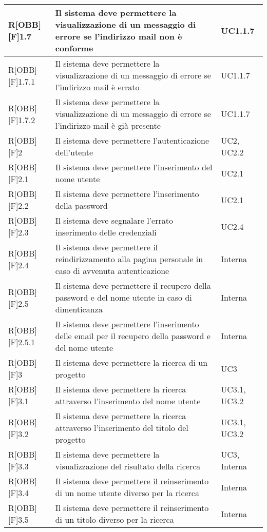 	\begin{table}[h]
			\begin{tabular}{|p{}|p{}|p{}|}
			\midrule
			R[OBB][F]1.7 & Il sistema deve permettere la visualizzazione di un messaggio di errore se l'indirizzo mail non è conforme & UC1.1.7 \\ \midrule
			R[OBB][F]1.7.1 & Il sistema deve permettere la visualizzazione di un messaggio di errore se l'indirizzo mail è errato & UC1.1.7 \\ \midrule
			R[OBB][F]1.7.2 & Il sistema deve permettere la visualizzazione di un messaggio di errore se l'indirizzo mail è già presente & UC1.1.7 \\ \midrule
			R[OBB][F]2 & Il sistema deve permettere l'autenticazione dell'utente & UC2, UC2.2 \\ \midrule
			R[OBB][F]2.1 & Il sistema deve permettere l'inserimento del nome utente & UC2.1 \\ \midrule
			R[OBB][F]2.2 & Il sistema deve permettere l'inserimento della password & UC2.1 \\ \midrule
			R[OBB][F]2.3 & Il sistema deve segnalare l'errato inserimento delle credenziali & UC2.4 \\ \midrule
			R[OBB][F]2.4 & Il sistema deve permettere il reindirizzamento alla pagina personale in caso di avvenuta autenticazione & Interna \\ \midrule
			R[OBB][F]2.5 & Il sistema deve permettere il recupero della password e del nome utente in caso di dimenticanza & Interna \\ \midrule
			R[OBB][F]2.5.1 & Il sistema deve permettere l'inserimento delle email per il recupero della password e del nome utente & Interna \\ \midrule
			R[OBB][F]3 & Il sistema deve permettere la ricerca di un progetto  & UC3 \\ \midrule
			R[OBB][F]3.1 & Il sistema deve permettere la ricerca attraverso l'inserimento del nome utente & UC3.1, UC3.2 \\ \midrule
			R[OBB][F]3.2 & Il sistema deve permettere la ricerca attraverso l'inserimento del titolo del progetto & UC3.1, UC3.2 \\ \midrule
			R[OBB][F]3.3 & Il sistema deve permettere la visualizzazione del risultato della ricerca & UC3, Interna \\ \midrule
			R[OBB][F]3.4 & Il sistema deve permettere il reinserimento di un nome utente diverso per la ricerca & Interna \\ \midrule
			R[OBB][F]3.5 & Il sistema deve permettere il reinserimento di un titolo diverso per la ricerca & Interna \\ \midrule


		\end{tabular}
	\end{table}
	\newpage

